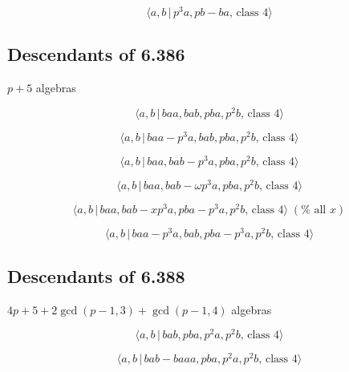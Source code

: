\documentclass[10pt]{article}
\begin{document}
\begin{equation}
\langle a,b\,|\,p^3a,pb-ba,\,\text{class }4\rangle  \tag{7.302}
\end{equation}

\subsection{Descendants of 6.386}

$p+5$ algebras

\begin{equation}
\langle a,b\,|\,baa,bab,pba,p^2b,\,\text{class }4\rangle  \tag{7.303}
\end{equation}

\begin{equation}
\langle a,b\,|\,baa-p^3a,bab,pba,p^2b,\,\text{class }4\rangle  \tag{7.304}
\end{equation}

\begin{equation}
\langle a,b\,|\,baa,bab-p^3a,pba,p^2b,\,\text{class }4\rangle  \tag{7.305}
\end{equation}

\begin{equation}
\langle a,b\,|\,baa,bab-\omega p^{3}a,pba,p^{2}b,\,\text{class }4\rangle 
\tag{7.306}
\end{equation}

\begin{equation}
\langle a,b\,|\,baa,bab-xp^3a,pba-p^3a,p^2b,\,\text{class }4\rangle \;(\text{%
all }x)  \tag{7.307}
\end{equation}

\begin{equation}
\langle a,b\,|\,baa-p^3a,bab,pba-p^3a,p^2b,\,\text{class }4\rangle 
\tag{7.308}
\end{equation}

\subsection{Descendants of 6.388}

$4p+5+2\gcd (p-1,3)+\gcd (p-1,4)$ algebras

\begin{equation}
\langle a,b\,|\,bab,pba,p^2a,p^2b,\,\text{class }4\rangle  \tag{7.309}
\end{equation}

\begin{equation}
\langle a,b\,|\,bab-baaa,pba,p^2a,p^2b,\,\text{class }4\rangle  \tag{7.310}
\end{equation}
\end{document}
